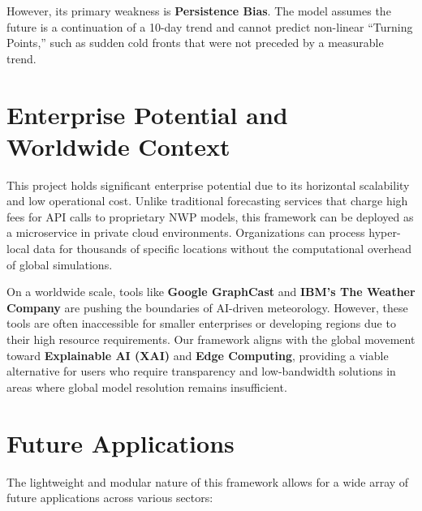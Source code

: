 \documentclass[14pt]{extarticle}
\begin{document}
However, its primary weakness is \textbf{Persistence Bias}. The model assumes the future is a continuation of a 10-day trend and cannot predict non-linear ``Turning Points,'' such as sudden cold fronts that were not preceded by a measurable trend.

\section{Enterprise Potential and Worldwide Context}
This project holds significant enterprise potential due to its horizontal scalability and low operational cost. Unlike traditional forecasting services that charge high fees for API calls to proprietary NWP models, this framework can be deployed as a microservice in private cloud environments. Organizations can process hyper-local data for thousands of specific locations without the computational overhead of global simulations.

On a worldwide scale, tools like \textbf{Google GraphCast} and \textbf{IBM's The Weather Company} are pushing the boundaries of AI-driven meteorology. However, these tools are often inaccessible for smaller enterprises or developing regions due to their high resource requirements. Our framework aligns with the global movement toward \textbf{Explainable AI (XAI)} and \textbf{Edge Computing}, providing a viable alternative for users who require transparency and low-bandwidth solutions in areas where global model resolution remains insufficient.

\section{Future Applications}
The lightweight and modular nature of this framework allows for a wide array of future applications across various sectors:
\end{document}
